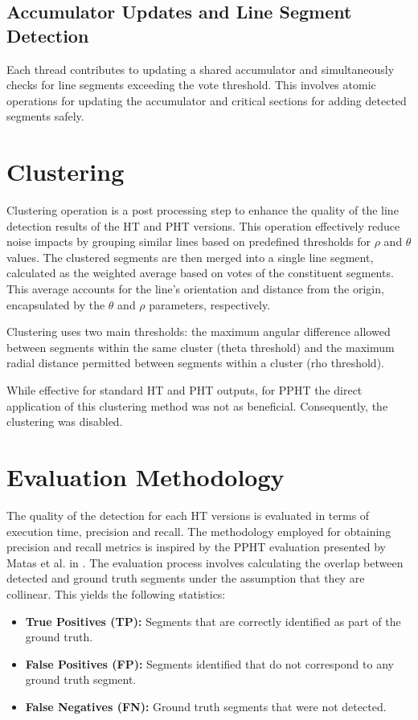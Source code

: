 \documentclass[conference]{IEEEtran}
\begin{document}
        \subsection{Accumulator Updates and Line Segment Detection}
        Each thread contributes to updating a shared accumulator and simultaneously checks for line segments exceeding the vote threshold. This involves atomic operations for updating the accumulator and critical sections for adding detected segments safely.

\section{Clustering}
\label{sec::ic}

    Clustering operation is a post processing step to enhance the quality of the line detection results of the HT and PHT versions. This operation effectively reduce noise impacts by grouping similar lines based on predefined thresholds for $\rho$ and $\theta$ values. The clustered segments are then merged into a single line segment, calculated as the weighted average based on votes of the constituent segments. This average accounts for the line's orientation and distance from the origin, encapsulated by the $\theta$ and $\rho$ parameters, respectively.

    Clustering uses two main thresholds: the maximum angular difference allowed between segments within the same cluster (theta threshold) and the maximum radial distance permitted between segments within a cluster (rho threshold). 
    
    While effective for standard HT and PHT outputs, for PPHT the direct application of this clustering method was not as beneficial. Consequently, the clustering was disabled.

\section{Evaluation Methodology}

    The quality of the detection for each HT versions is evaluated in terms of execution time, precision and recall. The methodology employed for obtaining precision and recall metrics is inspired by the PPHT evaluation presented by Matas et al. in \cite{PPHT}. The evaluation process involves calculating the overlap between detected and ground truth segments under the assumption that they are collinear. This yields the following statistics:
    
    \begin{itemize}
        \item \textbf{True Positives (TP):} Segments that are correctly identified as part of the ground truth.
        \item \textbf{False Positives (FP):} Segments identified that do not correspond to any ground truth segment.
        \item \textbf{False Negatives (FN):} Ground truth segments that were not detected.
    \end{itemize}
    
\end{document}

